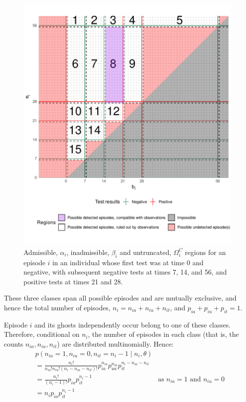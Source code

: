 \documentclass[thesis.tex]{subfiles}
\begin{document}
\begin{figure}
\includegraphics[width=\textwidth]{cis-perfect-testing/regions_diag}
\caption{Admissible, $\alpha_i$, inadmissible, $\beta_i$ and
untruncated, $\Omega_i^C$ regions for an episode $i$ in an
individual whose first test was at time 0 and negative, with subsequent
negative tests at times 7, 14, and 56, and positive tests at times 21
and 28. \label{perf-test:fig:partitionSpace}}
\end{figure}

These three classes span all possible episodes and are mutually
exclusive, and hence the total number of episodes,
$n_i = n_{ia} + n_{iu} + n_{it}$, and
$p_{ia} + p_{iu} + p_{it} = 1$.

Episode $i$ and its ghosts independently occur belong to one of these
classes. Therefore, conditional on $n_i$, the number of episodes in
each class (that is, the counts $n_{ia}, n_{iu}, n_{it}$) are
distributed multinomially. Hence:
\begin{align}
&p(n_{ia} = 1, n_{iu} = 0, n_{it} = n_i - 1 \mid n_i, \theta) \\
&= \frac{n_i!}{n_{ia}! n_{iu}! (n_i- n_{ia} - n_{it})!} p_{ia}^{n_{ia}} p_{ua}^{n_{ia}} p_{it}^{n_i- n_{ia} - n_{it}} \\
&= \frac{n_i!}{(n_i-1)!} p_{ia} p_{it}^{n_i- 1} &\text{as $n_{ia} = 1$ and $n_{iu} = 0$}\\
&= n_i p_{ia} p_{it}^{n_i- 1}
\end{align}
\end{document}
